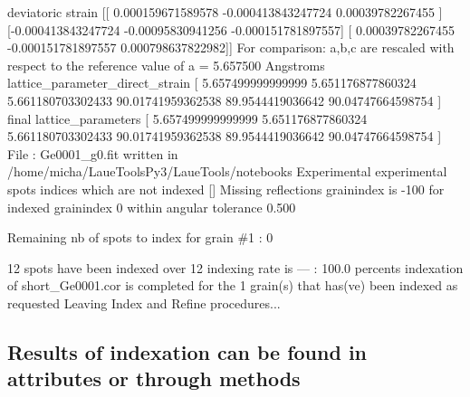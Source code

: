 \documentclass[letterpaper,10pt,english]{sphinxmanual}
\begin{document}
\begin{sphinxalltt}
deviatoric strain {[}{[} 0.000159671589578 -0.000413843247724  0.00039782267455 {]}
 {[}-0.000413843247724 -0.00095830941256  -0.000151781897557{]}
 {[} 0.00039782267455  -0.000151781897557  0.000798637822982{]}{]}
For comparison: a,b,c are rescaled with respect to the reference value of a = 5.657500 Angstroms
lattice\_parameter\_direct\_strain {[} 5.657499999999999  5.651176877860324  5.661180703302433
 90.01741959362538  89.9544419036642   90.04747664598754 {]}
final lattice\_parameters {[} 5.657499999999999  5.651176877860324  5.661180703302433
 90.01741959362538  89.9544419036642   90.04747664598754 {]}
File : Ge0001\_g0.fit written in /home/micha/LaueToolsPy3/LaueTools/notebooks
Experimental experimental spots indices which are not indexed {[}{]}
Missing reflections grainindex is -100 for indexed grainindex 0
within angular tolerance 0.500

 Remaining nb of spots to index for grain \#1 : 0

12 spots have been indexed over 12
indexing rate is --- : 100.0 percents
indexation of short\_Ge0001.cor is completed
for the 1 grain(s) that has(ve) been indexed as requested
Leaving Index and Refine procedures...
\end{sphinxalltt}

%
\begin{sphinxVerbatim}[commandchars=\\\{\}]
 \PYG{p}{[}\PYG{p}{]}
\end{sphinxVerbatim}

%
\begin{sphinxVerbatim}[commandchars=\\\{\}]
    
\end{sphinxVerbatim}


\subsection{Results of indexation can be found in attributes or through methods}
\label{\detokenize{Indexation:results-of-indexation-can-be-found-in-attributes-or-through-methods}}
%
\begin{sphinxVerbatim}[commandchars=\\\{\}]
\PYG{p}{[}\PYG{p}{]}
\end{sphinxVerbatim}
\end{document}
